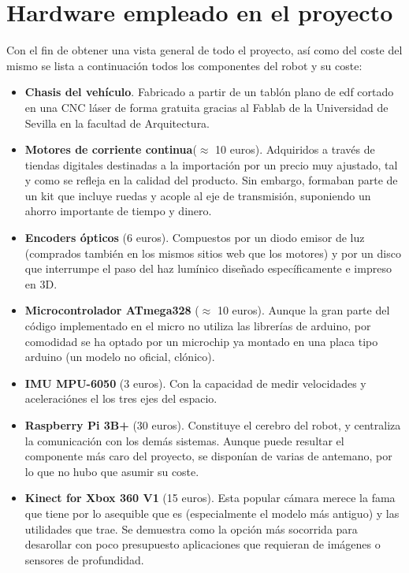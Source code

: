 \section{Hardware empleado en el proyecto}
Con el fin de obtener una vista general de todo el proyecto, así como del coste del mismo se lista a continuación todos los componentes del robot y su coste:
\begin{itemize}
	\item \textbf{Chasis del vehículo}. Fabricado a partir de un tablón plano de edf cortado en una CNC láser de forma gratuita gracias al Fablab de la Universidad de Sevilla en la facultad de Arquitectura.
	\item \textbf{Motores de corriente continua}($\approx$ 10 euros). Adquiridos a través de tiendas digitales destinadas a la importación por un precio muy ajustado, tal y como se refleja en la calidad del producto. Sin embargo, formaban parte de un kit que incluye ruedas y acople al eje de transmisión, suponiendo un ahorro importante de tiempo y dinero. 
	\item \textbf{Encoders ópticos} (6 euros). Compuestos por un diodo emisor de luz (comprados también en los mismos sitios web que los motores) y por un disco que interrumpe el paso del haz lumínico diseñado específicamente e impreso en 3D.
	\item \textbf{Microcontrolador ATmega328} ($\approx$ 10 euros). Aunque la gran parte del código implementado en el micro no utiliza las librerías de arduino, por comodidad se ha optado por un microchip ya montado en una placa tipo arduino (un modelo no oficial, clónico).
	\item \textbf{IMU MPU-6050} (3 euros). Con la capacidad de medir velocidades y aceleraciónes el los tres ejes del espacio.
	\item \textbf{Raspberry Pi 3B+} (30 euros). Constituye el cerebro del robot, y centraliza la comunicación con los demás sistemas. Aunque puede resultar el componente más caro del proyecto, se disponían de varias de antemano, por lo que no hubo que asumir su coste.
	\item \textbf{Kinect for Xbox 360 V1} (15 euros). Esta popular cámara merece la fama que tiene por lo asequible que es (especialmente el modelo más antiguo) y las utilidades que trae. Se demuestra como la opción más socorrida para desarollar con poco presupuesto aplicaciones que requieran de imágenes o sensores de profundidad.
\end{itemize}
